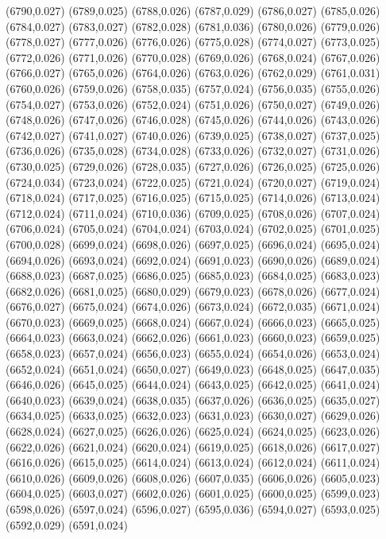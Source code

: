 (6790,0.027)
(6789,0.025)
(6788,0.026)
(6787,0.029)
(6786,0.027)
(6785,0.026)
(6784,0.027)
(6783,0.027)
(6782,0.028)
(6781,0.036)
(6780,0.026)
(6779,0.026)
(6778,0.027)
(6777,0.026)
(6776,0.026)
(6775,0.028)
(6774,0.027)
(6773,0.025)
(6772,0.026)
(6771,0.026)
(6770,0.028)
(6769,0.026)
(6768,0.024)
(6767,0.026)
(6766,0.027)
(6765,0.026)
(6764,0.026)
(6763,0.026)
(6762,0.029)
(6761,0.031)
(6760,0.026)
(6759,0.026)
(6758,0.035)
(6757,0.024)
(6756,0.035)
(6755,0.026)
(6754,0.027)
(6753,0.026)
(6752,0.024)
(6751,0.026)
(6750,0.027)
(6749,0.026)
(6748,0.026)
(6747,0.026)
(6746,0.028)
(6745,0.026)
(6744,0.026)
(6743,0.026)
(6742,0.027)
(6741,0.027)
(6740,0.026)
(6739,0.025)
(6738,0.027)
(6737,0.025)
(6736,0.026)
(6735,0.028)
(6734,0.028)
(6733,0.026)
(6732,0.027)
(6731,0.026)
(6730,0.025)
(6729,0.026)
(6728,0.035)
(6727,0.026)
(6726,0.025)
(6725,0.026)
(6724,0.034)
(6723,0.024)
(6722,0.025)
(6721,0.024)
(6720,0.027)
(6719,0.024)
(6718,0.024)
(6717,0.025)
(6716,0.025)
(6715,0.025)
(6714,0.026)
(6713,0.024)
(6712,0.024)
(6711,0.024)
(6710,0.036)
(6709,0.025)
(6708,0.026)
(6707,0.024)
(6706,0.024)
(6705,0.024)
(6704,0.024)
(6703,0.024)
(6702,0.025)
(6701,0.025)
(6700,0.028)
(6699,0.024)
(6698,0.026)
(6697,0.025)
(6696,0.024)
(6695,0.024)
(6694,0.026)
(6693,0.024)
(6692,0.024)
(6691,0.023)
(6690,0.026)
(6689,0.024)
(6688,0.023)
(6687,0.025)
(6686,0.025)
(6685,0.023)
(6684,0.025)
(6683,0.023)
(6682,0.026)
(6681,0.025)
(6680,0.029)
(6679,0.023)
(6678,0.026)
(6677,0.024)
(6676,0.027)
(6675,0.024)
(6674,0.026)
(6673,0.024)
(6672,0.035)
(6671,0.024)
(6670,0.023)
(6669,0.025)
(6668,0.024)
(6667,0.024)
(6666,0.023)
(6665,0.025)
(6664,0.023)
(6663,0.024)
(6662,0.026)
(6661,0.023)
(6660,0.023)
(6659,0.025)
(6658,0.023)
(6657,0.024)
(6656,0.023)
(6655,0.024)
(6654,0.026)
(6653,0.024)
(6652,0.024)
(6651,0.024)
(6650,0.027)
(6649,0.023)
(6648,0.025)
(6647,0.035)
(6646,0.026)
(6645,0.025)
(6644,0.024)
(6643,0.025)
(6642,0.025)
(6641,0.024)
(6640,0.023)
(6639,0.024)
(6638,0.035)
(6637,0.026)
(6636,0.025)
(6635,0.027)
(6634,0.025)
(6633,0.025)
(6632,0.023)
(6631,0.023)
(6630,0.027)
(6629,0.026)
(6628,0.024)
(6627,0.025)
(6626,0.026)
(6625,0.024)
(6624,0.025)
(6623,0.026)
(6622,0.026)
(6621,0.024)
(6620,0.024)
(6619,0.025)
(6618,0.026)
(6617,0.027)
(6616,0.026)
(6615,0.025)
(6614,0.024)
(6613,0.024)
(6612,0.024)
(6611,0.024)
(6610,0.026)
(6609,0.026)
(6608,0.026)
(6607,0.035)
(6606,0.026)
(6605,0.023)
(6604,0.025)
(6603,0.027)
(6602,0.026)
(6601,0.025)
(6600,0.025)
(6599,0.023)
(6598,0.026)
(6597,0.024)
(6596,0.027)
(6595,0.036)
(6594,0.027)
(6593,0.025)
(6592,0.029)
(6591,0.024)
